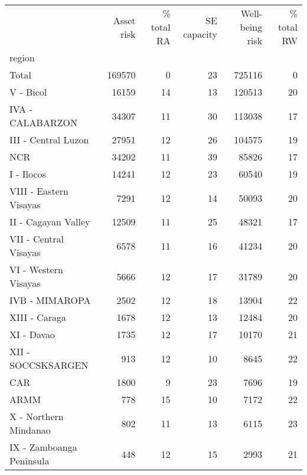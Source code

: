 \begin{tabular}{lrrrrr}
\toprule
{} &  Asset risk &  \% total RA &  SE capacity &  Well-being risk &  \% total RW \\
region                   &             &             &              &                  &             \\
\midrule
Total                    &      169570 &           0 &           23 &           725116 &           0 \\
V - Bicol                &       16159 &          14 &           13 &           120513 &          20 \\
IVA - CALABARZON         &       34307 &          11 &           30 &           113038 &          17 \\
III - Central Luzon      &       27951 &          12 &           26 &           104575 &          19 \\
NCR                      &       34202 &          11 &           39 &            85826 &          17 \\
I - Ilocos               &       14241 &          12 &           23 &            60540 &          19 \\
VIII - Eastern Visayas   &        7291 &          12 &           14 &            50093 &          20 \\
II - Cagayan Valley      &       12509 &          11 &           25 &            48321 &          17 \\
VII - Central Visayas    &        6578 &          11 &           16 &            41234 &          20 \\
VI - Western Visayas     &        5666 &          12 &           17 &            31789 &          20 \\
IVB - MIMAROPA           &        2502 &          12 &           18 &            13904 &          22 \\
XIII - Caraga            &        1678 &          12 &           13 &            12484 &          20 \\
XI - Davao               &        1735 &          12 &           17 &            10170 &          21 \\
XII - SOCCSKSARGEN       &         913 &          12 &           10 &             8645 &          22 \\
CAR                      &        1800 &           9 &           23 &             7696 &          19 \\
ARMM                     &         778 &          15 &           10 &             7172 &          22 \\
X - Northern Mindanao    &         802 &          11 &           13 &             6115 &          23 \\
IX - Zamboanga Peninsula &         448 &          12 &           15 &             2993 &          21 \\
\bottomrule
\end{tabular}
